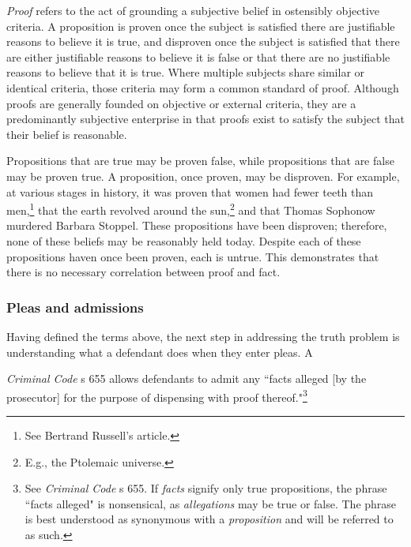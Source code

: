\textit{Proof} refers to the act of grounding a subjective belief in ostensibly objective criteria. A proposition is proven once the subject is satisfied there are justifiable reasons to believe it is true, and disproven once the subject is satisfied that there are either justifiable reasons to believe it is false or that there are no justifiable reasons to believe that it is true. Where multiple subjects share similar or identical criteria, those criteria may form a common standard of proof. Although proofs are generally founded on objective or external criteria, they are a predominantly subjective enterprise in that proofs exist to satisfy the subject that their belief is reasonable. 

Propositions that are true may be proven false, while propositions that are false may be proven true. A proposition, once proven, may be disproven. For example, at various stages in history, it was proven that women had fewer teeth than men,\footnote{See Bertrand Russell's article.} that the earth revolved around the sun,\footnote{E.g., the Ptolemaic universe.} and that Thomas Sophonow murdered Barbara Stoppel. These propositions have been disproven; therefore, none of these beliefs may be reasonably held today. Despite each of these propositions haven once been proven, each is untrue. This demonstrates that there is no necessary correlation between proof and fact.

\subsubsection{Pleas and admissions}

Having defined the terms above, the next step in addressing the truth problem is understanding what a defendant does when they enter pleas. A 

\textit{Criminal Code} s 655 allows defendants to admit any ``facts alleged [by the prosecutor] for the purpose of dispensing with proof thereof."\footnote{See \textit{Criminal Code} s 655. If \textit{facts} signify only true propositions, the phrase ``facts alleged" is nonsensical, as \textit{allegations} may be true or false. The phrase is best understood as synonymous with a \textit{proposition} and will be referred to as such.} 

